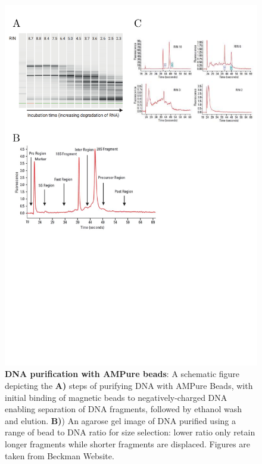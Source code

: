 \begin{figure}[!h]
	\centering
	\includegraphics[page=3,trim={0 8cm 0 0cm},clip, scale = 0.7]{Figures/General_Methodology_Figures.pdf}
	\captionsetup{width=0.95\textwidth}
	\caption[DNA purification with AMPure beads]%
	{\textbf{DNA purification with AMPure beads}: A schematic figure depicting the \textbf{A)} steps of purifying DNA with AMPure Beads, with initial binding of magnetic beads to negatively-charged DNA enabling separation of DNA fragments, followed by ethanol wash and elution. \textbf{B)}) An agarose gel image of DNA purified using a range of bead to DNA ratio for size selection: lower ratio only retain longer fragments while shorter fragments are displaced. Figures are taken from Beckman Website.}
	\label{fig:ampure_bead_workflow}
\end{figure}

\clearpage
